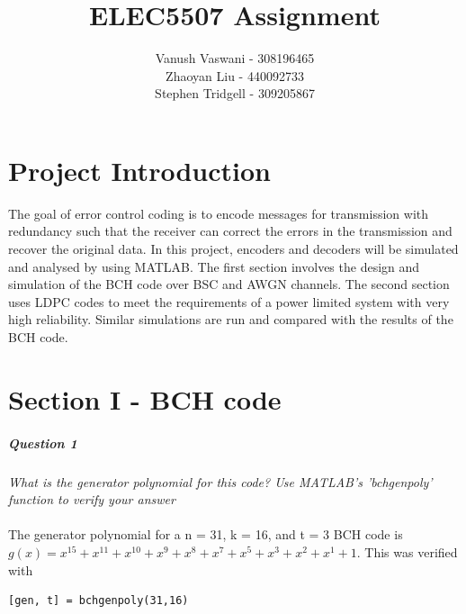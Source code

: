 \documentclass[a4paper]{article}
\begin{document}
\title{ELEC5507 Assignment}
\author{Vanush Vaswani - 308196465 \\
Zhaoyan Liu - 440092733 \\
Stephen Tridgell - 309205867}

\maketitle
\newpage
\tableofcontents
\listoffigures
\listoftables


\lstset{language=Matlab, frame=single, breaklines=true, keepspaces=true, columns=flexible, basicstyle=\ttfamily\footnotesize}
\newpage

\part*{Project Introduction}

The goal of error control coding is to encode messages for transmission with redundancy such that the receiver can correct the errors in the transmission and recover the original data. In this project, encoders and decoders will be simulated and analysed by using MATLAB. The first section involves the design and simulation of the BCH code over BSC and AWGN channels. The second section uses LDPC codes to meet the requirements of a power limited system with very high reliability. Similar simulations are run and compared with the results of the BCH code.

\part*{Section I - BCH code}

\subsubsection{Question 1} \textit{What is the generator polynomial for this code? Use MATLAB’s ’bchgenpoly’ function to verify your answer} \\
\\
The generator polynomial for a n = 31, k = 16, and t = 3 BCH code is $g(x) = x^{15} + x^{11} + 
x^{10} + x^{9} + x^{8} + x^{7} + x^{5} + x^{3} + x^{2} + x^{1} + 1$. 
This was verified with 
\begin{lstlisting}
[gen, t] = bchgenpoly(31,16)
\end{lstlisting}
\end{document}
